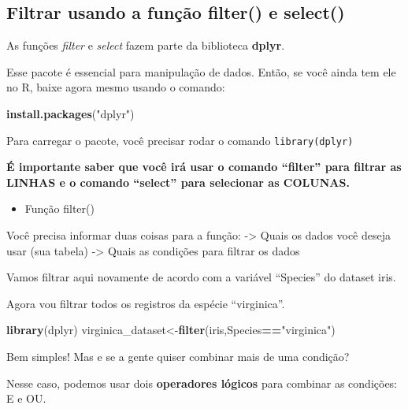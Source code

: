 \documentclass[
]{book}
\newenvironment{Shaded}{\begin{snugshade}}{\end{snugshade}}
\newcommand{\KeywordTok}[1]{\textcolor[rgb]{0.13,0.29,0.53}{\textbf{#1}}}
\newcommand{\NormalTok}[1]{#1}
\newcommand{\OperatorTok}[1]{\textcolor[rgb]{0.81,0.36,0.00}{\textbf{#1}}}
\newcommand{\StringTok}[1]{\textcolor[rgb]{0.31,0.60,0.02}{#1}}
\providecommand{\tightlist}{%
  \setlength{\itemsep}{0pt}\setlength{\parskip}{0pt}}
\begin{document}
\hypertarget{filtrar-usando-a-funuxe7uxe3o-filter-e-select}{%
\subsection{Filtrar usando a função filter() e
select()}\label{filtrar-usando-a-funuxe7uxe3o-filter-e-select}}

As funções \emph{filter} e \emph{select} fazem parte da biblioteca
\textbf{dplyr}.

Esse pacote é essencial para manipulação de dados. Então, se você ainda
tem ele no R, baixe agora mesmo usando o comando:

\begin{Shaded}
\begin{Highlighting}[]
\KeywordTok{install.packages}\NormalTok{(}\StringTok{"dplyr"}\NormalTok{)}
\end{Highlighting}
\end{Shaded}

Para carregar o pacote, você precisar rodar o comando
\texttt{library(dplyr)}

\textbf{É importante saber que você irá usar o comando ``filter'' para
filtrar as LINHAS e o comando ``select'' para selecionar as COLUNAS.}

\begin{itemize}
\tightlist
\item
  Função filter()
\end{itemize}

Você precisa informar duas coisas para a função: -\textgreater{} Quais
os dados você deseja usar (sua tabela) -\textgreater{} Quais as
condições para filtrar os dados

Vamos filtrar aqui novamente de acordo com a variável ``Species'' do
dataset iris.

Agora vou filtrar todos os registros da espécie ``virginica''.

\begin{Shaded}
\begin{Highlighting}[]
\KeywordTok{library}\NormalTok{(dplyr)}
\NormalTok{virginica_dataset<-}\KeywordTok{filter}\NormalTok{(iris,Species}\OperatorTok{==}\StringTok{"virginica"}\NormalTok{)}
\end{Highlighting}
\end{Shaded}

Bem simples! Mas e se a gente quiser combinar mais de uma condição?

Nesse caso, podemos usar dois \textbf{operadores lógicos} para combinar
as condições: E e OU.
\end{document}
